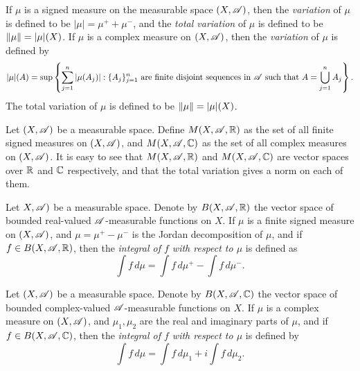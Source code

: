 \documentclass[12pt]{article}
\begin{document}
\begin{definition}[Variation]
    If $\mu$ is a signed measure on the measurable space $(X,\mathscr{A})$, then the \textit{variation} of $\mu$ is defined to be $|\mu|=\mu^++\mu^-$, and the \textit{total variation} of $\mu$ is defined to be $\left\lVert\mu\right\rVert=|\mu|(X)$. If $\mu$ is a complex measure on $(X,\mathscr{A})$, then the \textit{variation} of $\mu$ is defined by 
    \begin{equation*}
        |\mu|(A)=\sup\left\{\sum_{j=1}^n|\mu(A_j)|: \{A_j\}_{j=1}^n \text{ are finite disjoint sequences in $\mathscr{A}$ such that } A=\bigcup_{j=1}^n A_j\right\}.
    \end{equation*}
    The total variation of $\mu$ is defined to be $\left\lVert\mu\right\rVert=|\mu|(X)$.
\end{definition}
\begin{definition}
    Let $(X,\mathscr{A})$ be a measurable space. Define $M(X,\mathscr{A},\mathbb{R})$ as the set of all finite signed measures on $(X,\mathscr{A})$, and $M(X,\mathscr{A},\mathbb{C})$ as the set of all complex measures on $(X,\mathscr{A})$. It is easy to see that $M(X,\mathscr{A},\mathbb{R})$ and $M(X,\mathscr{A},\mathbb{C})$ are vector spaces over $\mathbb{R}$ and $\mathbb{C}$ respectively, and that the total variation gives a norm on each of them.
\end{definition}
\begin{definition}
    Let $X,\mathscr{A})$ be a measurable space. Denote by $B(X,\mathscr{A},\mathbb{R})$ the vector space of bounded real-valued $\mathscr{A}$-measurable functions on $X$. If $\mu$ is a finite signed measure on $(X,\mathscr{A})$, and $\mu=\mu^+-\mu^-$ is the Jordan decomposition of $\mu$, and if $f\in B(X,\mathscr{A},\mathbb{R})$, then the \textit{integral of $f$ with respect to $\mu$} is defined as
    \begin{equation*}
        \int f \, d\mu=\int f\, d\mu^+-\int f\, d\mu^-.
    \end{equation*}
\end{definition}
\begin{definition}
    Let $(X,\mathscr{A})$ be a measurable space. Denote by $B(X,\mathscr{A},\mathbb{C})$ the vector space of bounded complex-valued $\mathscr{A}$-measurable functions on $X$. If $\mu$ is a complex measure on $(X,\mathscr{A})$, and $\mu_1,\mu_2$ are the real and imaginary parts of $\mu$, and if $f\in B(X,\mathscr{A},\mathbb{C})$, then the \textit{integral of $f$ with respect to $\mu$} is defined by
    \begin{equation*}
        \int f\,d\mu=\int f\,d\mu_1+i\int f \,d\mu_2.
    \end{equation*}
\end{definition}
\end{document}
